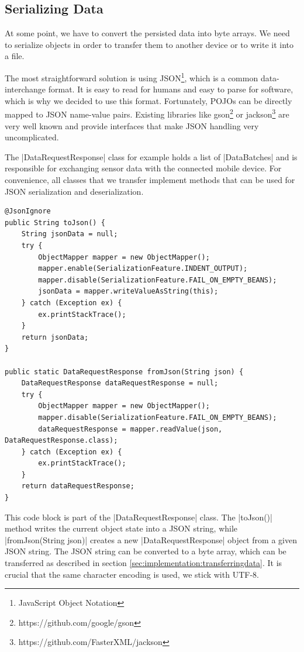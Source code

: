 \subsection{Serializing Data}
\label{sec:implementation:serializingdata}

At some point, we have to convert the persisted data into byte arrays.
We need to serialize objects in order to transfer them to another device or to write it into a file.

The most straightforward solution is using JSON\footnote{JavaScript Object Notation}, which is a common data-interchange format.
It is easy to read for humans and easy to parse for software, which is why we decided to use this format.
Fortunately, POJOs can be directly mapped to JSON name-value pairs.
Existing libraries like gson\footnote{https://github.com/google/gson} or jackson\footnote{https://github.com/FasterXML/jackson} are very well known and provide interfaces that make JSON handling very uncomplicated.

The |DataRequestResponse|\cite{sensordatalogger:datarequestresponse} class for example holds a list of |DataBatches| and is responsible for exchanging sensor data with the connected mobile device.
For convenience, all classes that we transfer implement methods that can be used for JSON serialization and deserialization.

\clearpage

\begin{lstlisting}[label=serialization]
@JsonIgnore
public String toJson() {
	String jsonData = null;
	try {
		ObjectMapper mapper = new ObjectMapper();
		mapper.enable(SerializationFeature.INDENT_OUTPUT);
		mapper.disable(SerializationFeature.FAIL_ON_EMPTY_BEANS);
		jsonData = mapper.writeValueAsString(this);
	} catch (Exception ex) {
		ex.printStackTrace();
	}
	return jsonData;
}

public static DataRequestResponse fromJson(String json) {
	DataRequestResponse dataRequestResponse = null;
	try {
		ObjectMapper mapper = new ObjectMapper();
		mapper.disable(SerializationFeature.FAIL_ON_EMPTY_BEANS);
		dataRequestResponse = mapper.readValue(json, DataRequestResponse.class);
	} catch (Exception ex) {
		ex.printStackTrace();
	}
	return dataRequestResponse;
}
\end{lstlisting}

This code block is part of the |DataRequestResponse| class.
The |toJson()| method writes the current object state into a JSON string, while |fromJson(String json)| creates a new |DataRequestResponse| object from a given JSON string.
The JSON string can be converted to a byte array, which can be transferred as described in section \ref{sec:implementation:transferringdata}.
It is crucial that the same character encoding is used, we stick with UTF-8.


